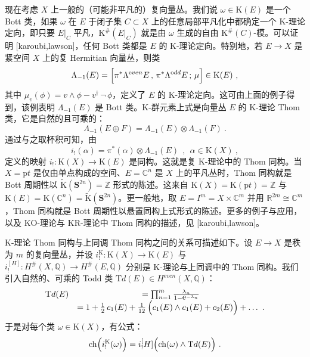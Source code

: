 \documentclass[11pt,a4paper]{ctexart}
\begin{document}
现在考虑 \(X\) 上一般的（可能非平凡的）复向量丛。我们说 \(\omega\in {\mathrm K}(E)\) 是一个 Bott 类，如果 \(\omega\) 在 \(E\) 于闭子集 \(C\subset X\) 上的任意局部平凡化中都确定一个 K-理论定向，即只要 \(E|_C\) 平凡，\({\mathrm K}^\#(E|_C)\) 就是由 \(\omega\) 生成的自由 \({\mathrm K}^\#(C)\)-模。可以证明 [karoubi,lawson]，任何 Bott 类都是 \(E\) 的 K-理论定向。特别地，若 \(E\rightarrow X\) 是紧空间 \(X\) 上的复 Hermitian 向量丛，则类 \[\Lambda_{-1}(E)=\Bigl[\pi^*\Lambda^{\mathrm even}E\,,\,
\pi^*\Lambda^{\mathrm odd}E\,;\,\mu\Bigr]\in
{\mathrm K}(E)\ ,\] 其中 \(\mu_v(\phi)=v\wedge\phi-v^\dagger\,\neg\,\phi\)，定义了 \(E\) 的 K-理论定向。这可由上面的例子得到，该例表明 \(\Lambda_{-1}(E)\) 是 Bott 类。K-群元素上式是向量丛 \(E\) 的 K-理论 Thom 类，它是自然的且可乘的： \[\Lambda_{-1}(E\oplus F)=\Lambda_{-1}(E)\otimes\Lambda_{-1}(F) \ .\] 通过与之取杯积可知，由 \[i_{!}(\alpha)=\pi^*(\alpha)\otimes\Lambda_{-1}(E)\ \ , \ \ \alpha\in{\mathrm K}(X)\ ,\] 定义的映射 \(i_!:{\mathrm K}(X)\rightarrow {\mathrm K}(E)\) 是同构。这就是复 K-理论中的 Thom 同构。当 \(X={\mathrm  pt}\) 是仅由单点构成的空间、\(E={\mathbb{C}}^n\) 是 \(X\) 上的平凡丛时，Thom 同构就是 Bott 周期性以 \(\widetilde{{\mathrm K}}({\mathbf S}^{2n})={\mathbb{Z}}\) 形式的陈述。这来自 \({\mathrm K}(X)={\mathrm K}({\mathrm pt})={\mathbb{Z}}\) 与 \({\mathrm K}(E)={\mathrm K}({\mathbb{C}}^n)=\widetilde{{\mathrm K}}({\mathbf S}^{2n})\)。更一般地，取 \(E=I^m=X\times{\mathbb{C}}^m\) 并用 \({\mathbb{R}}^{2m}
\cong{\mathbb{C}}^m\)，Thom 同构就是 Bott 周期性以悬置同构上式形式的陈述。更多的例子与应用，以及 KO-理论与 KR-理论中 Thom 同构的描述，见 [karoubi,lawson]。

K-理论 Thom 同构与上同调 Thom 同构之间的关系可描述如下。设 \(E\to X\) 是秩为 \(m\) 的复向量丛，并设 \(i_!^{\mathrm K}:{\mathrm K}(X)\to{\mathrm K}(E)\) 与 \(i_!^[H]:H^\#(X,{\mathbb{Q}})\to H^\#(E,{\mathbb{Q}})\) 分别是 K-理论与上同调中的 Thom 同构。我们引入自然的、可乘的 Todd 类 \({\mathrm Td}(E)\in H^{\mathrm even}(X,{\mathbb{Q}})\)： \[\begin{matrix}
{\mathrm Td}(E)&=\prod_{n=1}^m\frac{\lambda_n}{1-\mbox{e}^{-\lambda_n}}\\
&=1+\mbox{$\frac12$}\,c_1(E)+\mbox{$\frac1{12}$}\,\Bigl(c_1(E)\wedge
c_1(E)+c_2(E)\Bigr)+\ldots \ .
\end{matrix}\] 于是对每个类 \(\omega\in{\mathrm K}(X)\)，有公式： \[\mathrm{ch}\Bigl(i_!^{\mathrm K}(\omega)\Bigr)=i_!^[H]\Bigl(\mathrm{ch}(\omega)\wedge
{\mathrm Td}(E)\Bigr) \ .\]
\end{document}

